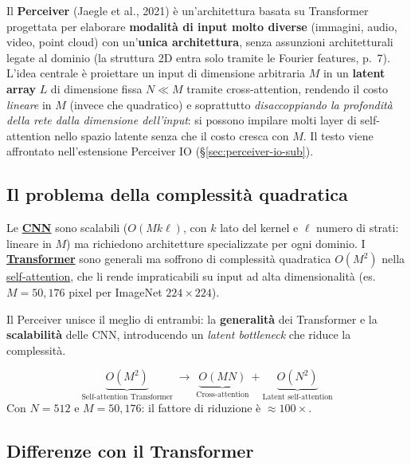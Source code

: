 \documentclass[
  11pt,
]{article}
\begin{document}
Il \textbf{Perceiver} (Jaegle et al., 2021) è un'architettura basata su Transformer progettata per elaborare \textbf{modalità di input molto diverse} (immagini, audio, video, point cloud) con un'\textbf{unica architettura}, senza assunzioni architetturali legate al dominio (la struttura 2D entra solo tramite le Fourier features, p.~7). L'idea centrale è proiettare un input di dimensione arbitraria $M$ in un \textbf{latent array} $L$ di dimensione fissa $N \ll M$ tramite cross-attention, rendendo il costo \emph{lineare} in $M$ (invece che quadratico) e soprattutto \emph{disaccoppiando la profondità della rete dalla dimensione dell'input}: si possono impilare molti layer di self-attention nello spazio latente senza che il costo cresca con $M$. Il testo viene affrontato nell'estensione Perceiver IO (\S\ref{sec:perceiver-io-sub}).

\subsection{Il problema della complessità quadratica}

Le \hyperref[app:cnn]{\textbf{CNN}} sono scalabili ($O(M k \ell)$, con $k$ lato del kernel e $\ell$ numero di strati: lineare in $M$) ma richiedono architetture specializzate per ogni dominio. I \hyperref[app:transformer]{\textbf{Transformer}} sono generali ma soffrono di complessità quadratica $O(M^2)$ nella \hyperref[app:self-vs-cross]{self-attention}, che li rende impraticabili su input ad alta dimensionalità (es.\ $M = 50{,}176$ pixel per ImageNet $224 \times 224$).

Il Perceiver unisce il meglio di entrambi: la \textbf{generalità} dei Transformer e la \textbf{scalabilità} delle CNN, introducendo un \emph{latent bottleneck} che riduce la complessità.

\begin{formulabox}[title={\textbf{Riduzione della complessità}}]
\[
\underbrace{O(M^2)}_{\text{Self-attention Transformer}} \;\longrightarrow\; \underbrace{O(MN)}_{\text{Cross-attention}} + \underbrace{O(N^2)}_{\text{Latent self-attention}}
\]
Con $N = 512$ e $M = 50{,}176$: il fattore di riduzione è $\approx 100\times$.
\end{formulabox}

\clearpage
\subsection{Differenze con il Transformer}
\label{sec:diff-transformer}
\end{document}
